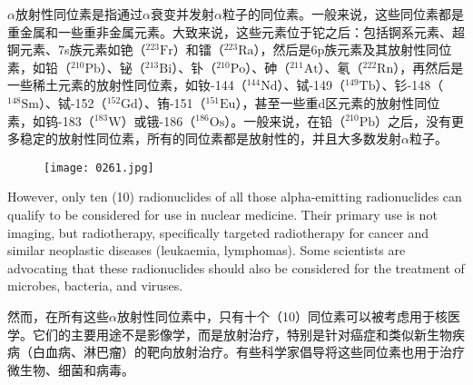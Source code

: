 \documentclass[dvipsnames, svgnames,a4paper,11pt]{article}
\begin{document}
$\alpha$放射性同位素是指通过$\alpha$衰变并发射$\alpha$粒子的同位素。一般来说，这些同位素都是重金属和一些重非金属元素。大致来说，这些元素位于铊之后：包括锕系元素、超锕元素、7s族元素如铯（\(\mathrm{^{223}Fr}\)）和镭（\(\mathrm{^{223}Ra}\)），然后是6p族元素及其放射性同位素，如铅（\(\mathrm{^{210}Pb}\)）、铋（\(\mathrm{^{213}Bi}\)）、钋（\(\mathrm{^{210}Po}\)）、砷（\(\mathrm{^{211}At}\)）、氡（\(\mathrm{^{222}Rn}\)），再然后是一些稀土元素的放射性同位素，如钕-144（\(\mathrm{^{144}Nd}\)）、铽-149（\(\mathrm{^{149}Tb}\)）、钐-148（\(\mathrm{^{148}Sm}\)）、铽-152（\(\mathrm{^{152}Gd}\)）、铕-151（\(\mathrm{^{151}Eu}\)），甚至一些重d区元素的放射性同位素，如钨-183（\(\mathrm{^{183}W}\)）或锇-186（\(\mathrm{^{186}Os}\)）。一般来说，在铅（\(\mathrm{^{210}Pb}\)）之后，没有更多稳定的放射性同位素，所有的同位素都是放射性的，并且大多数发射$\alpha$粒子。  

\begin{figure}[h]
    \centering
    \texttt{[image: 0261.jpg]}
     \label{fig352}
\end{figure}

However, only ten (10) radionuclides of all those alpha-emitting radionuclides can qualify to be considered for use in nuclear medicine. Their primary use is not imaging, but radiotherapy, specifically targeted radiotherapy for cancer and similar neoplastic diseases (leukaemia, lymphomas). Some scientists are advocating that these radionuclides should also be considered for the treatment of microbes, bacteria, and viruses.  

然而，在所有这些$\alpha$放射性同位素中，只有十个（10）同位素可以被考虑用于核医学。它们的主要用途不是影像学，而是放射治疗，特别是针对癌症和类似新生物疾病（白血病、淋巴瘤）的靶向放射治疗。有些科学家倡导将这些同位素也用于治疗微生物、细菌和病毒。  
\end{document}
